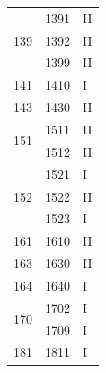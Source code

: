 \documentclass[12pt,a4paper]{article}
\begin{document}
{\begin{longtable}{@{}lll@{}}
		\multirow{3}{*}{139}                          & 1391                                         & II                                \\ \cmidrule(l){2-3} 
		& 1392                                         & II                                \\ \cmidrule(l){2-3} 
		& 1399                                         & II                                \\ \midrule
		141                                           & 1410                                         & I                                 \\ \midrule
		143                                           & 1430                                         & II                                \\ \midrule
		\multirow{2}{*}{151}                          & 1511                                         & II                                \\ \cmidrule(l){2-3} 
		& 1512                                         & II                                \\ \midrule
		\multirow{3}{*}{152}                          & 1521                                         & I                                 \\ \cmidrule(l){2-3} 
		& 1522                                         & II                                \\ \cmidrule(l){2-3} 
		& 1523                                         & I                                 \\ \midrule
		161                                           & 1610                                         & II                                \\ \midrule
		163                                           & 1630                                         & II                                \\ \midrule
		164                                           & 1640                                         & I                                 \\ \midrule
		\multirow{2}{*}{170}                          & 1702                                         & I                                 \\ \cmidrule(l){2-3} 
		& 1709                                         & I                                 \\ \midrule
		181                                           & 1811                                         & I                                 \\ \midrule

\end{longtable}}
\end{document}
